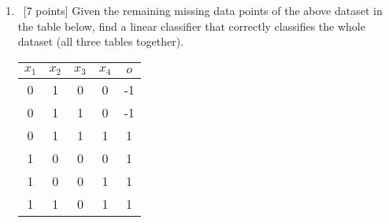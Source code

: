 \begin{enumerate}
\item ~[7 points] Given the remaining missing data points of the above dataset in the table below, find a linear classifier that correctly classifies the whole dataset (all three tables together). 
  \begin{center}
    \begin{tabular}{cccc|c}
      $x_1$ & $x_2$ & $x_3$ & $x_4$ & $o$ \\ \hline
      0 & 1 & 0 & 0 & -1\\
      0 & 1 & 1 & 0 & -1 \\
      0 & 1 & 1 & 1 & 1 \\
      1 & 0 & 0 & 0 & 1 \\
      1 & 0 & 0 & 1 & 1 \\
      1 & 1 & 0 & 1 & 1 \\
    \end{tabular}
  \end{center}
\end{enumerate}






